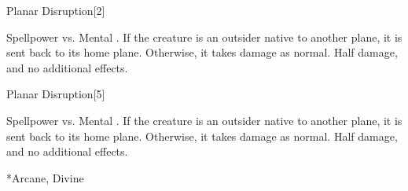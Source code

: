 \begin{spellsection}{Planar Disruption}[2]
    \begin{spellheader}
    \end{spellheader}
    \begin{spellcontent}
        \begin{spelltargetinginfo}
        \end{spelltargetinginfo}
        \begin{spelleffects}
            \begin{spellattack}{Spellpower vs. Mental}
                \spellsuccess {}.
                \spellcritical If the creature is an outsider native to another plane, it is sent back to its home plane. Otherwise, it takes damage as normal.
                \spellfailure Half damage, and no additional effects.
            \end{spellattack}
        \end{spelleffects}
    \end{spellcontent}
    \begin{spellfooter}
        \miscastrandom
    \end{spellfooter}
\end{spellsection}

\begin{spellsection}[Mass]{Planar Disruption}[5]
    \begin{spellheader}
    \end{spellheader}
    \begin{spellcontent}
        \begin{spelltargetinginfo}
        \end{spelltargetinginfo}
        \begin{spelleffects}
            \begin{spellattack}{Spellpower vs. Mental}
                \spellsuccess {}.
                \spellcritical If the creature is an outsider native to another plane, it is sent back to its home plane. Otherwise, it takes damage as normal.
                \spellfailure Half damage, and no additional effects.
            \end{spellattack}
        \end{spelleffects}
    \end{spellcontent}
    \begin{spellfooter}
        *{Arcane, Divine}
        \miscastexplode
    \end{spellfooter}
\end{spellsection}

